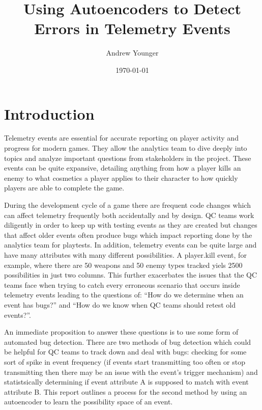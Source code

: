\documentclass[a4paper,11pt]{article}
\title{Using Autoencoders to Detect Errors in Telemetry Events}
\author{Andrew Younger}
\date{\today}
\begin{document}
\begin{titlingpage}
 \maketitle
\end{titlingpage}
\newpage
{}
\tableofcontents
\newpage
{}
\section{Introduction}
Telemetry events are essential for accurate reporting on player activity and progress for modern games. They allow the analytics team to dive deeply into topics and analyze important questions from stakeholders in the project. These events can be quite expansive, detailing anything from how a player kills an enemy to what cosmetics a player applies to their character to how quickly players are able to complete the game.
\par
During the development cycle of a game there are frequent code changes which can affect telemetry frequently both accidentally and by design. QC teams work diligently in order to keep up with testing events as they are created but changes that affect older events often produce bugs which impact reporting done by the analytics team for playtests. In addition, telemetry events can be quite large and have many attributes with many different possibilities. A player.kill event, for example, where there are 50 weapons and 50 enemy types tracked yiels 2500 possibilities in just two columns. This further exacerbates the issues that the QC teams face when trying to catch every erroneous scenario that occurs inside telemetry events leading to the questions of: ``How do we determine when an event has bugs?'' and ``How do we know when QC teams should retest old events?''.
\par
An immediate proposition to answer these questions is to use some form of automated bug detection. There are two methods of bug detection which could be helpful for QC teams to track down and deal with bugs: checking for some sort of spike in event frequency (if events start transmitting too often or stop transmitting then there may be an issue with the event's trigger mechanism) and statistsically determining if event attribute A is supposed to match with event attribute B. This report outlines a process for the second method by using an autoencoder to learn the possibility space of an event.
\end{document}
